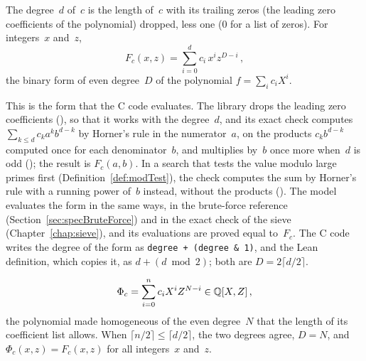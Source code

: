 \begin{definition}\label{def:binaryForm}
  \leanok
  The degree~$d$ of~$c$ is the length of~$c$ with its trailing zeros (the leading zero coefficients
  of the polynomial) dropped, less one ($0$ for a list of zeros). For integers~$x$ and~$z$,
  \[ F_c(x, z) = \sum_{i=0}^{d} c_i\, x^i z^{D-i}\,, \]
  the binary form of even degree~$D$ of the polynomial $f = \sum_i c_i X^i$.
\end{definition}

\begin{remark}\label{rem:binaryFormC}
  This is the form that the C code evaluates. The library drops the leading zero coefficients
  (), so that it works with the degree~$d$, and its exact check
  computes $\sum_{k \le d} c_k a^k b^{d-k}$ by Horner's rule in the numerator~$a$, on the products
  $c_k b^{d-k}$ computed once for each denominator~$b$, and multiplies by~$b$ once more when~$d$ is
  odd (); the result is $F_c(a, b)$. In a search that tests the
  value modulo large primes first (Definition~\ref{def:modTest}), the check computes the sum by
  Horner's rule with a running power of~$b$ instead, without the products
  (). The model evaluates the form in the same ways, in the
  brute-force reference (Section~\ref{sec:specBruteForce}) and in the exact check of the sieve
  (Chapter~\ref{chap:sieve}), and its evaluations are proved equal to~$F_c$. The C code writes the
  degree of the form as \verb|degree + (degree & 1)|, and the Lean definition, which copies it, as
  $d + (d \bmod 2)$; both are $D = 2 \lceil d/2 \rceil$.
\end{remark}

\begin{definition}\label{def:binaryFormPoly}
  \leanok
  \[ \Phi_c = \sum_{i=0}^{n} c_i X^i Z^{N-i} \in \mathbb{Q}[X, Z]\,, \]
  the polynomial made homogeneous of the even degree~$N$ that the length of its coefficient list
  allows. When $\lceil n/2 \rceil \le \lceil d/2 \rceil$, the two degrees agree, $D = N$, and
  $\Phi_c(x, z) = F_c(x, z)$ for all integers~$x$ and~$z$.
\end{definition}

